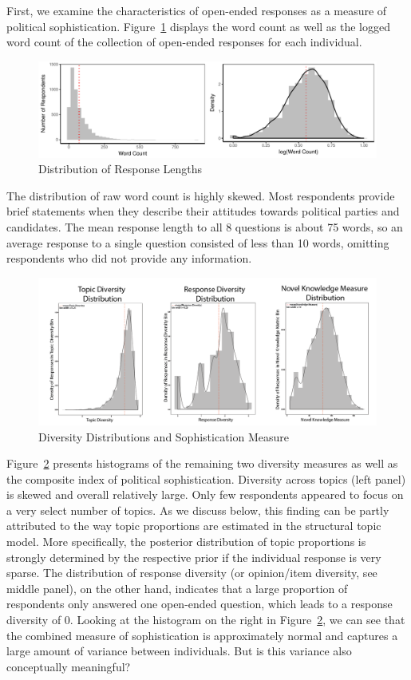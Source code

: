 \documentclass[12pt]{article}
\begin{document}
First, we examine the characteristics of open-ended responses as a measure of political sophistication. Figure~\ref{fig:wc} displays the word count as well as the logged word count of the collection of open-ended responses for each individual.

\begin{figure}[h]
\includegraphics[width=\textwidth]{../fig/wc.pdf}
\caption{Distribution of Response Lengths}\label{fig:wc}
\end{figure}

The distribution of raw word count is highly skewed. Most respondents provide brief statements when they describe their attitudes towards political parties and candidates. The mean response length to all 8 questions is about 75 words, so an average response to a single question consisted of less than 10 words, omitting respondents who did not provide any information.
\begin{figure}[h]
\includegraphics[width=\textwidth]{../fig/diversity_distributions.png}
\caption{Diversity Distributions and Sophistication Measure}\label{fig:diversity}
\end{figure}

Figure~\ref{fig:diversity} presents histograms of the remaining two diversity measures as well as the composite index of political sophistication. Diversity across topics (left panel) is skewed and overall relatively large. Only few respondents appeared to focus on a very select number of topics. As we discuss below, this finding can be partly attributed to the way topic proportions are estimated in the structural topic model. More specifically, the posterior distribution of topic proportions is strongly determined by the respective prior if the individual response is very sparse. The distribution of response diversity (or opinion/item diversity, see middle panel), on the other hand, indicates that a large proportion of respondents only answered one open-ended question, which leads to a response diversity of 0. Looking at the histogram on the right in Figure~\ref{fig:diversity}, we can see that the combined measure of sophistication is approximately normal and captures a large amount of variance between individuals. But is this variance also conceptually meaningful?
\end{document}
